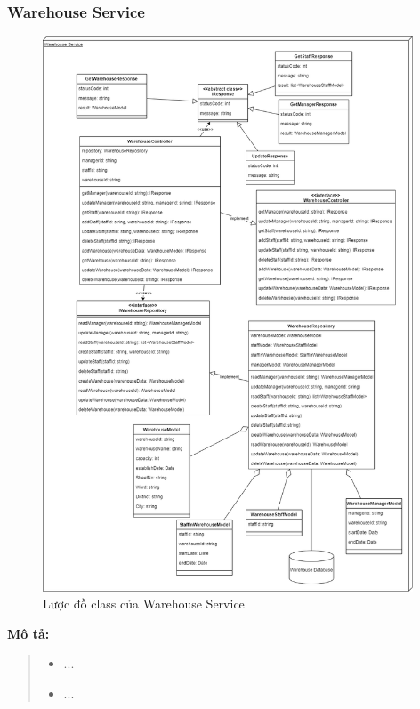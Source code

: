 \subsubsection{Warehouse Service}
\begin{figure}[!htp]
	\centering
	\includegraphics[width=11cm]{img/Architecture/service/WarehouseService.png}
	\newline
	\caption{Lược đồ class của Warehouse Service}
\end{figure}
\textbf{Mô tả:}
\begin{quote}
	\begin{itemize}
		\item ...
		\item ...
	\end{itemize}
\end{quote}

